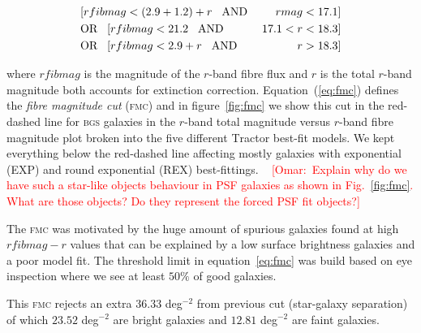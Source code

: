 \documentclass[fleqn,usenatbib]{mnras}
\newcommand{\omar}[1]{~\newline\noindent \textcolor{red}{{ [Omar:~{#1}]\\}}}
\newcommand{\BGS}{\textsc{bgs}\xspace}
\newcommand{\FMC}{{\textsc{fmc}}\xspace}
\newcommand{\TRACTOR}{\textsc{T}ractor\xspace}
\begin{document}
\begin{eqnarray}\label{eq:fmc}
    & [rfibmag < (2.9 + 1.2) + r  \hspace{3 mm} \text{AND} \hspace{1 mm} & rmag < 17.1 ] \nonumber \\
    & \text{OR} \hspace{3 mm} [rfibmag < 21.2 \hspace{3 mm} \text{AND} \hspace{1 mm} &17.1 < r < 18.3] \nonumber \\ 
    & \text{OR} \hspace{3 mm}  [rfibmag < 2.9 + r \hspace{3 mm} \text{AND} \hspace{1 mm} &r > 18.3]
\end{eqnarray}

where $rfibmag$ is the magnitude of the $r$-band fibre flux and $r$ is the total $r$-band magnitude both accounts for extinction correction. Equation~(\ref{eq:fmc}) defines the {\it fibre magnitude cut} (\FMC) and in figure~\ref{fig:fmc} we show this cut in the red-dashed line for \BGS galaxies in the $r$-band total magnitude versus $r$-band fibre magnitude plot broken into the five different \TRACTOR best-fit models. We kept everything below the red-dashed line affecting mostly galaxies with exponential (EXP) and round exponential (REX) best-fittings. 
\omar{Explain why do we have such a star-like objects behaviour in PSF galaxies as shown in Fig.~\ref{fig:fmc}. What are those objects? Do they represent the forced PSF fit objects?}

The \FMC was motivated by the huge amount of spurious galaxies found at high $rfibmag - r$ values that can be explained by a low surface brightness galaxies and a poor model fit. The threshold limit in equation~\ref{eq:fmc} was build based on eye inspection where we see at least $50 \%$ of good galaxies.


This \FMC rejects an extra $36.33$ deg$^{-2}$ from previous cut (star-galaxy separation) of which $23.52$ deg$^{-2}$ are bright galaxies and $12.81$ deg$^{-2}$ are faint galaxies.
\end{document}
